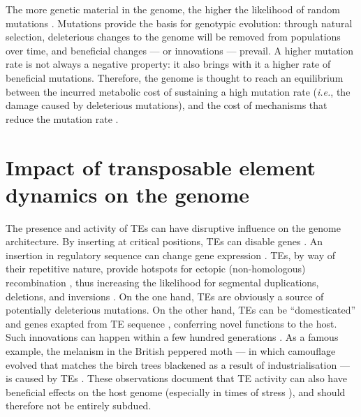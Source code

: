 The more genetic material in the genome, the higher the likelihood of
random mutations \citep{Wielgoss2011}. Mutations provide the basis for
genotypic evolution: through natural selection, deleterious changes to
the genome will be removed from populations over time, and beneficial
changes --- or innovations --- prevail. A higher mutation rate is not
always a negative property: it also brings with it a higher rate of
beneficial mutations. Therefore, the genome is thought to reach an
equilibrium between the incurred metabolic cost of sustaining a high
mutation rate (\emph{i.e.}, the damage caused by deleterious mutations),
and the cost of mechanisms that reduce the mutation rate
\citep{Bernstein1987, Altenberg2011}.

\section{Impact of transposable element dynamics on the genome}

The presence and activity of TEs can have disruptive influence on the
genome architecture. By inserting at critical positions, TEs can disable
genes \citep{Kazazian1988}. An insertion in regulatory sequence can
change gene expression \citep{Warnefors2010}. TEs, by way of their
repetitive nature, provide hotspots for ectopic (non-homologous)
recombination \citep{Lim1988, Gray2000, Fiston-Lavier2007}, thus
increasing the likelihood for segmental duplications, deletions, and
inversions \citep{Mathiopoulos1998, Remnant2013}. On the one hand, TEs
are obviously a source of potentially deleterious mutations. On the
other hand, TEs can be ``domesticated'' and genes exapted from TE
sequence \citep{Gahan2001, Daborn2002, Aminetzach2005, Chen2007},
conferring novel functions to the host. Such innovations can happen
within a few hundred generations \citep{Dolgin2006, Struchiner2009,
Kofler2015}. As a famous example, the melanism in the British peppered
moth --- in which camouflage evolved that matches the birch trees
blackened as a result of industrialisation --- is caused by TEs
\citep{Hof2016}. These observations document that TE activity can also
have beneficial effects on the host genome (especially in times of
stress \citep{Chenais2012}), and should therefore not be entirely
subdued.

